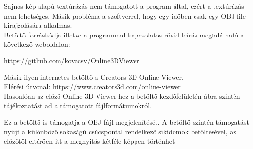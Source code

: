 Sajnos kép alapú textúrázás nem támogatott a program által, ezért a textúrázás nem lehetséges. Másik probléma a szoftverrel, hogy egy időben csak egy OBJ file kirajzolására alkalmas.\\

Betöltő forráskódja illetve a programmal kapcsolatos rövid leírás megtalálható a következő weboldalon:

\url{https://github.com/kovacsv/Online3DViewer}
\newpage
{}

Másik ilyen internetes betöltő a Creators 3D Online Viewer.\cite{creators2018creators3d}\\
Elérési útvonal: \url{https://www.creators3d.com/online-viewer}\\

\noindent Hasonlóan az előző Online 3D Viewer-hez a betöltő kezdőfelületén  ábra szintén tájékoztatást ad a támogatott fájlformátumokról.

Ez a betöltő is támogatja a OBJ fájl megjelenítését. A betöltő szintén támogatást nyújt a különböző sokaságú csúcspontal rendelkező síkidomok betöltésével, az előzőtől eltérően itt a megnyitás kétféle képpen történhet

